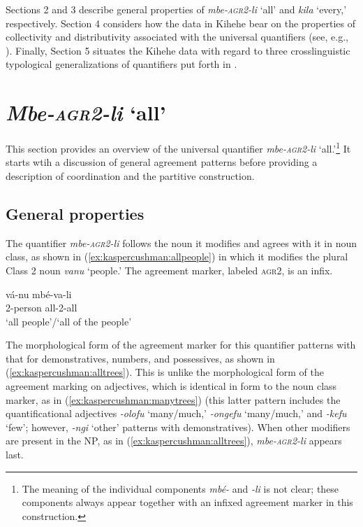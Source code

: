 \documentclass[letterpaper, 12pt]{article}
\begin{document}
Sections 2 and 3 describe general properties of \textit{mbe-\textsc{agr2}-li} `all' and \textit{kila} `every,' respectively. Section 4 considers how the data in Kihehe bear on the properties of collectivity and distributivity associated with the universal quantifiers (see, e.g., \citet{szabolcsi10}). Finally, Section 5 situates the Kihehe data with regard to three crosslinguistic typological generalizations of quantifiers put forth in \citealt{matthewson13}. 


\section{\emph{Mbe-\textsc{agr2}-li} `all'}

This section provides an overview of the universal quantifier \emph{mbe-\textsc{agr2}-li} `all.'\footnote{The meaning of the individual components \textit{mb\'e-} and \textit{-li} is not clear; these components always appear together with an infixed agreement marker in this construction.} It starts wtih a discussion of general agreement patterns before providing a description of coordination and the partitive construction. 

\subsection{General properties}

 The quantifier \emph{mbe-\textsc{agr2}-li} follows the noun it modifies and agrees with it in noun class, as shown in (\ref{ex:kaspercushman:allpeople}) in which it modifies the plural Class 2 noun \textit{vanu} `people.' The agreement marker, labeled \textsc{agr2}, is an infix.  

\begin{exe}
\ex \gll v\'a-nu mb\'e-va-li \label{ex:kaspercushman:allpeople} \\
2-person all-2-all \\
`all people'/`all of the people'\footnotemark \\

\end{exe}

The morphological form of the agreement marker for this quantifier patterns with that for demonstratives, numbers, and possessives, as shown in (\ref{ex:kaspercushman:alltrees}).  This is unlike the morphological form of the agreement marking on adjectives, which is identical in form to the noun class marker, as in (\ref{ex:kaspercushman:manytrees}) (this latter pattern includes the quantificational adjectives \textit{-olofu} `many/much,' \textit{-ongefu} `many/much,' and \textit{-kefu} `few'; however, \textit{-ngi} `other' patterns with demonstratives). When other modifiers are present in the NP, as in (\ref{ex:kaspercushman:alltrees}),   \textit{mbe-\textsc{agr2}-li} appears last.
\end{document}
